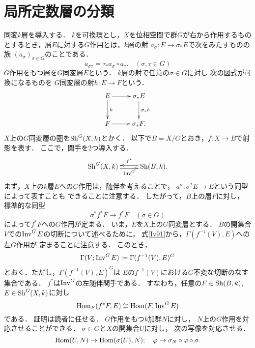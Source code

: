 \clearpage
\section{局所定数層の分類{\cite[IV.9]{Iv}}}

同変\(k\)層を導入する．
\(k\)を可換環とし，\(X\)を位相空間で群\(G\)が右から作用するもの
とするとき，層\(E\)に対する\(G\)作用とは，\(k\)層の射
\(a_\sigma\colon E\to \sigma_{\ast}E\)で次をみたすものの族
\((a_\sigma)_{\sigma\in G}\)のことである．
\begin{equation}
    a_{\sigma\tau}=\tau_{\ast}a_\sigma\circ a_{\tau}. \quad(\sigma,\tau\in G)\label{Iv91}
\end{equation}
\(G\)作用をもつ層を\(G\)同変層\(E\)という．
\(k\)層の射で任意の\(\sigma\in G\)に対し
次の図式が可換になるものを
\(G\)同変層の射\(h\colon E\to F\)という．
\[
    \vcenter{\xymatrix@C=26pt@R=26pt{
        E
        \ar[r]^-{}
        \ar[d]^-{h}
        &
        \sigma_\ast E
        \ar[d]^-{\sigma_\ast h} 
        \\
        F \ar[r]^-{}
        &
        \sigma_\ast F.
    }}
\]
\(X\)上の\(G\)同変層の圏を\(\mathrm{Sh}^G(X,k)\)とかく．
以下で\(B=X/G\)とおき，\(f\colon X\to B\)で射影を表す．
ここで，関手を2つ導入する．
\begin{equation}
    \vcenter{\xymatrix@C=26pt@R=26pt{
        \Sh^G(X,k)
        \ar@<-0.5ex>[r]_-{\Inv^G}
        &
        \Sh(B,k)
        \ar@<-0.5ex>[l]_-{f^\ast}.
    }}\label{Iv92}
\end{equation}
まず，\(X\)上の\(k\)層\(E\)への\(G\)作用は，随伴を考えることで，
\(a^{\sigma}\colon\sigma^\ast E\to E\)という同型によって表すことも
できることに注意する．
したがって，\(B\)上の層\(F\)に対し，
標準的な同型\[
    \sigma^\ast f^\ast F\to f^\ast F\quad (\sigma\in G)
\]によって\(f^\ast F\)への\(G\)作用が定まる．
いま，\(E\)を\(X\)上の\(G\)同変層とする．
\(B\)の開集合\(V\)での\(\mathop{\mathrm{Inv}}\nolimits^G E\)の切断について述べるために，
式\eqref{Iv91}から，\(\Gamma(f^{-1}(V),E)\)への左\(G\)作用が
定まることに注意する．
このとき，
\[
    \Gamma(V;\mathop{\mathrm{Inv}}\nolimits^G E)\coloneqq 
    \Gamma(f^{-1}(V),E)^G
\]
とおく．ただし，\(\Gamma(f^{-1}(V),E)^G\)は
\(E\)の\(f^{-1}(V)\)における\(G\)不変な切断のなす集合である．
\(f^\ast\)は\(\mathop{\mathrm{Inv}}\nolimits^G\)の左随伴関手である．
すなわち，任意の\(F\in\mathrm{Sh}(B,k)\), \(E\in\mathrm{Sh}^G(X,k)\)に対し
\begin{equation}
    \mathop{\mathrm{Hom}}\nolimits_F(f^\ast{F},E)\cong \mathop{\mathrm{Hom}}\nolimits(F,\mathop{\mathrm{Inv}}\nolimits^G{E})
\end{equation}
である．
証明は読者に任せる．
\(G\)作用をもつ\(k\)加群\(N\)に対し，
\(N\)上の\(G\)作用を対応させることができる．
\(\sigma\in G\)と\(X\)の開集合\(U\)に対し，
次の写像を対応させる．
\begin{equation}
    \mathop{\mathrm{Hom}}\nolimits(U,N)\to \mathop{\mathrm{Hom}}\nolimits(\sigma(U),N);
    \quad 
    \varphi\to \sigma_N\circ \varphi\circ\sigma.
\end{equation}








